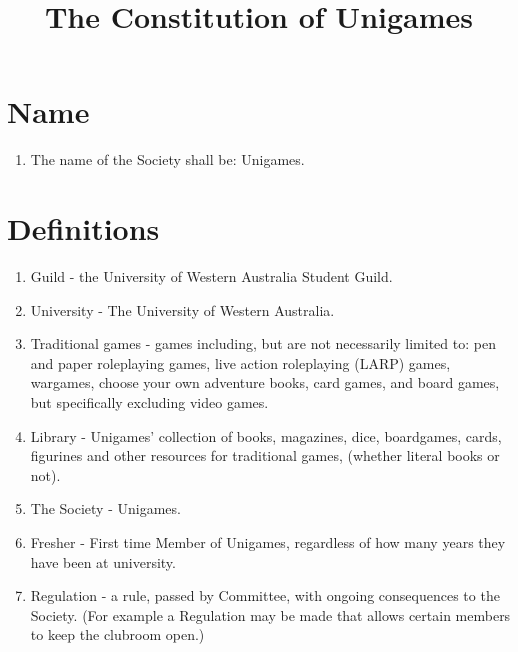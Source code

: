 \documentclass[a4paper]{article}
\title{The Constitution of Unigames}
\author{}
\date{}
\begin{document}
\maketitle


\section{Name} \label{sec:name}
\begin{enumerate}
    \item The name of the Society shall be: Unigames.
\end{enumerate}


\section{Definitions} \label{sec:definitions}
\begin{enumerate}
    \item Guild - the University of Western Australia Student Guild.
    \item University - The University of Western Australia.
    \item Traditional games - games including, but are not necessarily limited to: pen and paper roleplaying games, live action roleplaying (LARP) games, wargames, choose your own adventure books, card games, and board games, but specifically excluding video games.
    \item Library - Unigames' collection of books, magazines, dice, boardgames, cards, figurines and other resources for traditional games, (whether literal books or not).
    \item The Society - Unigames.
    \item Fresher - First time Member of Unigames, regardless of how many years they have been at university.
    \item Regulation - a rule, passed by Committee, with ongoing consequences to the Society. (For example a Regulation may be made that allows certain members to keep the clubroom open.)
\end{enumerate}
\end{document}
